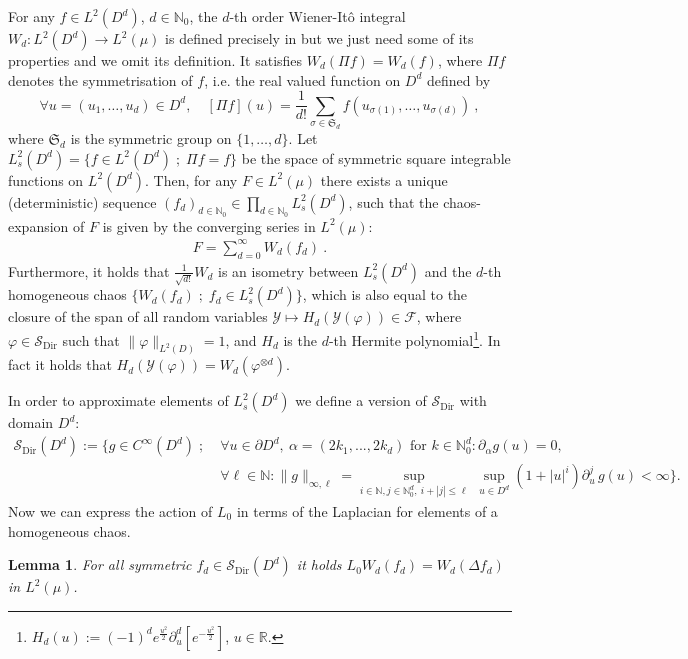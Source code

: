 \documentclass[a4paper, reqno, 12pt]{amsart}
\theoremstyle{plain}
\newtheorem{lemma}[definition]{Lemma}
\theoremstyle{definition}
\newcommand{\N}{\mathbb{N}}
\newcommand{\Sdir}{\mathcal{S}_{\text{Dir}}}
\begin{document}
For any $f \in L^2 (D^d)$, $d\in\N_0$, the $d$-th order Wiener-Itô integral $W_d:L^2(D^d)\to L^2(\mu)$ is defined precisely in \cite[Section 1.1.2]{N06} but we just need some of its properties and we omit its definition. It satisfies $W_d (\Pi f)=W_d(f)$, where $\Pi f$ denotes the symmetrisation of $f$, i.e. the real valued function on $D^d$ defined by
\begin{equation}
\forall u=(u_1,\ldots, u_d)  \in D^d, \quad [\Pi f] (u) = \frac{1}{d!} \sum_{\sigma \in \mathfrak S_d} f (u_{\sigma(1)}, \ldots, u_{\sigma(d)}) \ ,      
\end{equation}
where $\mathfrak S_d$ is the symmetric group on $\{1, \ldots, d\}$. Let $L_s^2 (D^d) = \{f \in L^2 (D^d) \; ; \; \Pi f =f\}$ be the space of symmetric square integrable functions on $L^2 (D^d)$. Then, for any $F\in L^2(\mu)$ there exists a unique (deterministic) sequence $(f_d)_{d\in\N_0} \in \prod_{d \in\N_0} L^2_s(D^d)$, such that the chaos-expansion of $F$ is given by the converging series in $L^2(\mu)$:
\begin{align*}
    F = \sum_{d=0}^{\infty} W_d(f_d) \ .
\end{align*}
Furthermore, it holds that $\frac{1}{\sqrt{d!}} W_d$ is an isometry between $L^2_s (D^d)$ and the $d$-th homogeneous chaos $\Big\{W_d(f_d)\; ; \;  f_d\in L^2_{s}(D^d)\Big\}$, which is also equal to the closure of the span of all random variables $\mathcal Y \mapsto H_d (\mathcal Y (\varphi)) \in \mathcal F$, where $\varphi\in \Sdir$ such that $\|\varphi\|_{L^2 (D)} =1$, and $H_d$ is the $d$-th Hermite polynomial{\footnote{$H_d(u):= (-1)^d e^{\frac{u^2}{2}} \partial_u^d [ e^{-\frac{u^2}{2}}]$, $u \in \mathbb R$. }.} In fact it holds that $H_d(\mathcal Y(\varphi)) = W_d(\varphi^{\otimes d})$.
\medskip

In order to approximate elements of $L^2_s(D^d)$ we define a version of $\Sdir$ with domain $D^d$:
\begin{equation}
\label{eq:sdird}
\begin{split}
    \Sdir(D^d) := \Big\{ g\in C^{\infty}(D^d) \; ; \;  & \forall u\in\partial D^d, \ \alpha = (2k_1,...,2k_d)\text{ for } k\in\mathbb{N}_0^d :\partial_{\alpha} g(u) = 0 , \\
    & \forall \ell\in\N :\|g\|_{\infty, \ell} = \sup_{i\in\N,j\in \N_0^d,\ i + |j| \leq \ell}\ \sup_{u\in D ^d}(1+|u|^i)\partial^j_u \, g(u) <\infty \Big\}.
\end{split}
\end{equation}
Now we can express the action of $L_0$ in terms of the Laplacian for elements of a homogeneous chaos. 
\begin{lemma} 
\label{lem:laplaceinvariance}
For all symmetric $f_d \in \Sdir (D^d)$ it holds $L_0 W_d(f_d) = W_d(\Delta f_d)$ in $L^2(\mu)$.
\end{lemma}
\end{document}

